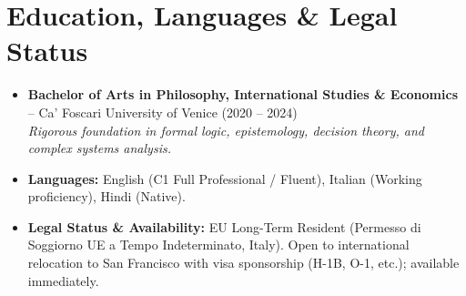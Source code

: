 \documentclass[a4paper,10pt]{article}
\begin{document}
\section{Education, Languages \& Legal Status}
\begin{itemize}
  \item \textbf{Bachelor of Arts in Philosophy, International Studies \& Economics} -- Ca' Foscari University of Venice (2020 -- 2024) \\
  \textit{Rigorous foundation in formal logic, epistemology, decision theory, and complex systems analysis.}
  \item \textbf{Languages:} English (C1 Full Professional / Fluent), Italian (Working proficiency), Hindi (Native).
  \item \textbf{Legal Status \& Availability:} EU Long-Term Resident (Permesso di Soggiorno UE a Tempo Indeterminato, Italy). Open to international relocation to San Francisco with visa sponsorship (H-1B, O-1, etc.); available immediately.
\end{itemize}
\end{document}
